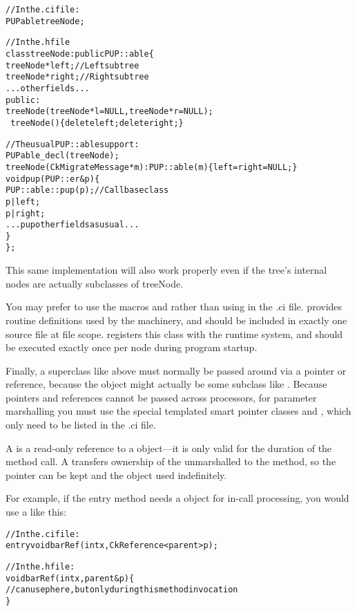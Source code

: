 \begin{alltt}
// In the .ci file:
    PUPable treeNode;

// In the .h file
class treeNode : public PUP::able \{
    treeNode *left;//Left subtree
    treeNode *right;//Right subtree
    ... other fields ...
public:
    treeNode(treeNode *l=NULL, treeNode *r=NULL);
    ~treeNode() \{delete left; delete right;\}
    
    // The usual PUP::able support:
    PUPable\_decl(treeNode);
    treeNode(CkMigrateMessage *m) : PUP::able(m) \{ left=right=NULL; \}
    void pup(PUP::er &p) \{
        PUP::able::pup(p);//Call base class
        p|left;
        p|right;
        ... pup other fields as usual ...
    \}
\};
\end{alltt}

This same implementation will also work properly even if the tree's
internal nodes are actually subclasses of treeNode.

You may prefer to use the macros 
and  rather than using 
in the .ci file.   provides routine definitions used
by the  machinery, and should be included in exactly one
source file at file scope.   registers this class
with the runtime system, and should be executed exactly once per node 
during program startup.

Finally, a  superclass like  above 
must normally be passed around via a pointer or reference, because the object
might actually be some subclass like .  Because
pointers and references cannot be passed across processors,
for parameter marshalling you must use the special templated 
smart pointer classes  and ,
which only need to be listed in the .ci file.

A  is a read-only reference to a  object---it
is only valid for the duration of the method call.  A 
transfers ownership of the unmarshalled  to the method, so the 
pointer can be kept and the object used indefinitely.  

For example, if the entry method  needs a  
object for in-call processing, you would use a  like this:

\begin{alltt}
// In the .ci file:
    entry void barRef(int x,CkReference<parent> p);

// In the .h file:
    void barRef(int x,parent &p) \{
      // can use p here, but only during this method invocation
    \}
\end{alltt}

